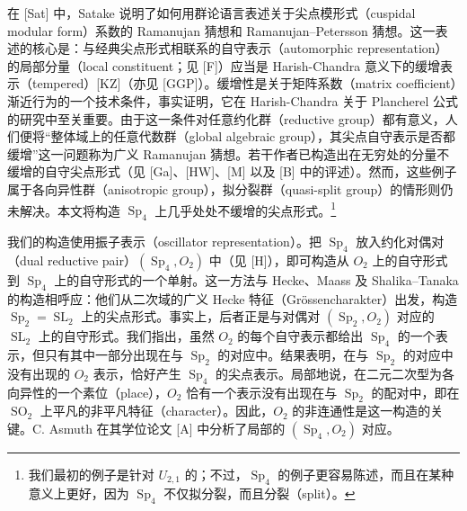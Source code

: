 
在 [Sat] 中，Satake 说明了如何用群论语言表述关于尖点模形式（cuspidal modular form）系数的 Ramanujan 猜想和 Ramanujan--Petersson 猜想。这一表述的核心是：与经典尖点形式相联系的自守表示（automorphic representation）的局部分量（local constituent；见 [F]）应当是 Harish-Chandra 意义下的缓增表示（tempered）[KZ]（亦见 [GGP]）。缓增性是关于矩阵系数（matrix coefficient）渐近行为的一个技术条件，事实证明，它在 Harish-Chandra 关于 Plancherel 公式的研究中至关重要。由于这一条件对任意约化群（reductive group）都有意义，人们便将“整体域上的任意代数群（global algebraic group），其尖点自守表示是否都缓增”这一问题称为广义 Ramanujan 猜想。若干作者已构造出在无穷处的分量不缓增的自守尖点形式（见 [Ga]、[HW]、[M] 以及 [B] 中的评述）。然而，这些例子属于各向异性群（anisotropic group），拟分裂群（quasi-split group）的情形则仍未解决。本文将构造 $\operatorname{Sp}_4$ 上几乎处处不缓增的尖点形式。\footnote{我们最初的例子是针对 $U_{2,1}$ 的；不过，$\operatorname{Sp}_4$ 的例子更容易陈述，而且在某种意义上更好，因为 $\operatorname{Sp}_4$ 不仅拟分裂，而且分裂（split）。}

我们的构造使用振子表示（oscillator representation）。把 $\operatorname{Sp}_4$ 放入约化对偶对（dual reductive pair）$(\operatorname{Sp}_4,O_2)$ 中（见 [H]），即可构造从 $O_2$ 上的自守形式到 $\operatorname{Sp}_4$ 上的自守形式的一个单射。这一方法与 Hecke、Maass 及 Shalika--Tanaka 的构造相呼应：他们从二次域的广义 Hecke 特征（Grössencharakter）出发，构造 $\operatorname{Sp}_2=\operatorname{SL}_2$ 上的尖点形式。事实上，后者正是与对偶对 $(\operatorname{Sp}_2,O_2)$ 对应的 $\operatorname{SL}_2$ 上的自守形式。我们指出，虽然 $O_2$ 的每个自守表示都给出 $\operatorname{Sp}_4$ 的一个表示，但只有其中一部分出现在与 $\operatorname{Sp}_2$ 的对应中。结果表明，在与 $\operatorname{Sp}_2$ 的对应中没有出现的 $O_2$ 表示，恰好产生 $\operatorname{Sp}_4$ 的尖点表示。局部地说，在二元二次型为各向异性的一个素位（place），$O_2$ 恰有一个表示没有出现在与 $\operatorname{Sp}_2$ 的配对中，即在 $\operatorname{SO}_2$ 上平凡的非平凡特征（character）。因此，$O_2$ 的非连通性是这一构造的关键。C. Asmuth 在其学位论文 [A] 中分析了局部的 $(\operatorname{Sp}_4,O_2)$ 对应。

